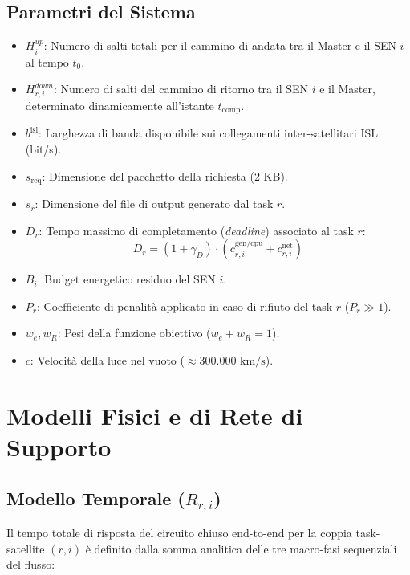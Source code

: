 \documentclass[12pt]{article}
\begin{document}
\subsection{Parametri del Sistema}
\begin{itemize}
    \item $H_i^{up}$: Numero di salti totali per il cammino di andata tra il Master e il SEN $i$ al tempo $t_0$.
    \item $H_{r,i}^{down}$: Numero di salti del cammino di ritorno tra il SEN $i$ e il Master, determinato dinamicamente all'istante $t_{\text{comp}}$.
    \item $b^{\text{isl}}$: Larghezza di banda disponibile sui collegamenti inter-satellitari ISL (bit/s).
    \item $s_{\text{req}}$: Dimensione del pacchetto della richiesta (2 KB).
    \item $s_r$: Dimensione del file di output generato dal task $r$.
    \item $D_r$: Tempo massimo di completamento (\textit{deadline}) associato al task $r$:
    \begin{equation}
    D_r = (1 + \gamma_D) \cdot \left( c_{r,i}^{\text{gen/cpu}} + c_{r,i}^{\text{net}} \right)
    \end{equation}
    \item $B_i$: Budget energetico residuo del SEN $i$.
    \item $P_r$: Coefficiente di penalit\`a applicato in caso di rifiuto del task $r$ ($P_r \gg 1$).
    \item $w_e, w_R$: Pesi della funzione obiettivo ($w_e + w_R = 1$).
    \item $c$: Velocit\`a della luce nel vuoto ($\approx 300.000 \text{ km/s}$).
\end{itemize}

\section{Modelli Fisici e di Rete di Supporto}

\subsection{Modello Temporale ($R_{r,i}$)}
Il tempo totale di risposta del circuito chiuso end-to-end per la coppia task-satellite $(r,i)$ \`e definito dalla somma analitica delle tre macro-fasi sequenziali del flusso:
\end{document}
